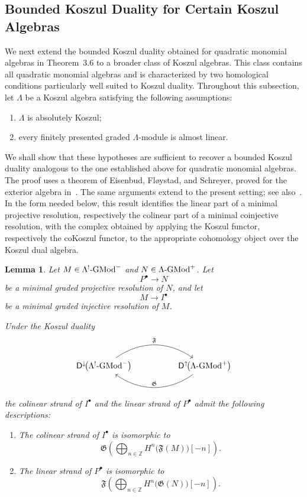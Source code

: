 \documentclass[11pt]{article}
\newtheorem{lemma}[theorem]{Lemma}
\theoremstyle{definition}
\theoremstyle{remark}
\begin{document}
\subsection{Bounded Koszul Duality for Certain Koszul Algebras} We next extend the bounded Koszul duality obtained for quadratic monomial algebras in Theorem~3.6 to a broader class of Koszul algebras. This class contains all quadratic monomial algebras and is characterized by two homological conditions particularly well suited to Koszul duality. Throughout this subsection, let \(\Lambda\) be a Koszul algebra satisfying the following assumptions: \begin{enumerate} \item[\textup{(i)}] \(\Lambda\) is absolutely Koszul; \item[\textup{(ii)}] every finitely presented graded \(\Lambda\)-module is almost linear. \end{enumerate} We shall show that these hypotheses are sufficient to recover a bounded Koszul duality analogous to the one established above for quadratic monomial algebras. The proof uses a theorem of Eisenbud, Fl{\o}ystad, and Schreyer, proved for the exterior algebra in~\cite[Lemma~3.5, Corollary~3.6, and Theorem~3.7]{17}. The same arguments extend to the present setting; see also~\cite[Proposition~3.4]{41}. In the form needed below, this result identifies the linear part of a minimal projective resolution, respectively the colinear part of a minimal coinjective resolution, with the complex obtained by applying the Koszul functor, respectively the coKoszul functor, to the appropriate cohomology object over the Koszul dual algebra.

\begin{lemma}
Let \(M\in \Lambda^{!}\textup{-}\mathrm{GMod}^{-}\) and
\(N\in \Lambda\textup{-}\mathrm{GMod}^{+}\).
Let
\[
P^{\bullet}\longrightarrow N
\]
be a minimal graded projective resolution of \(N\), and let
\[
M\longrightarrow I^{\bullet}
\]
be a minimal graded injective resolution of \(M\).

Under the Koszul duality
\[
\begin{tikzcd}[column sep=huge]
\mathsf{D}^{\downarrow}\!\bigl(\Lambda^{!}\textup{-}\mathrm{GMod}^{-}\bigr)
\arrow[r, bend left=35, "\mathfrak{F}"]
&
\mathsf{D}^{\uparrow}\!\bigl(\Lambda\textup{-}\mathrm{GMod}^{+}\bigr)
\arrow[l, bend left=35, "\mathfrak{G}"']
\end{tikzcd}
\]
the colinear strand of \(I^{\bullet}\) and the linear strand of
\(P^{\bullet}\) admit the following descriptions:
\begin{enumerate}
\item[\textup{(i)}]
The colinear strand of \(I^{\bullet}\) is isomorphic to
\[
\mathfrak{G}\!\left(
\bigoplus_{n\in\mathbb Z}
H^{n}\!\bigl(\mathfrak{F}(M)\bigr)[-n]
\right).
\]

\item[\textup{(ii)}]
The linear strand of \(P^{\bullet}\) is isomorphic to
\[
\mathfrak{F}\!\left(
\bigoplus_{n\in\mathbb Z}
H^{n}\!\bigl(\mathfrak{G}(N)\bigr)[-n]
\right).
\]
\end{enumerate}
\end{lemma}
\end{document}
